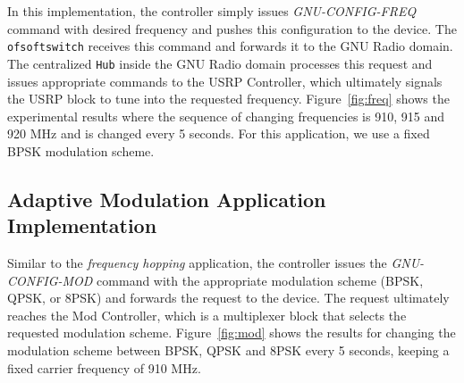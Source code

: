 In this implementation,  the controller simply issues \emph{GNU-CONFIG-FREQ} command with desired frequency and pushes this configuration to the device. The \texttt{ofsoftswitch} receives this command and forwards it to the GNU Radio domain. The centralized \texttt{\crossflow Hub} inside the GNU Radio domain processes this request and issues appropriate commands to the  USRP Controller, which ultimately signals the USRP block to tune into the requested frequency. Figure~\ref{fig:freq} shows the experimental results where the sequence of changing frequencies is 910, 915 and 920 MHz and is changed every 5 seconds. For this application, we use a fixed BPSK modulation scheme.


\subsection{Adaptive Modulation  Application Implementation}

Similar to the \emph{frequency hopping} application, the controller issues the \emph{GNU-CONFIG-MOD} command with the appropriate modulation scheme (BPSK, QPSK, or 8PSK) and forwards the request to the device. The request ultimately reaches the Mod Controller, which is a multiplexer block that selects the requested modulation scheme. Figure~\ref{fig:mod} shows the results for changing the modulation scheme between BPSK, QPSK and 8PSK every 5 seconds, keeping a fixed carrier frequency of 910 MHz.
